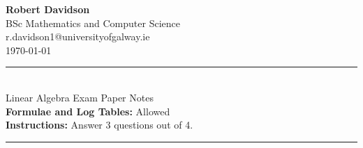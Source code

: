 \documentclass[a4paper, 10pt]{article}
\begin{document}
\begin{center}
    \large
    \textbf{Robert Davidson}\\[8pt]
    \normalsize
    BSc Mathematics and Computer Science \\
    r.davidson1@universityofgalway.ie\\[8pt]
    \today\\[12pt]
\end{center}
\begin{center}
    \vspace*{\fill}
    \rule{0.9\textwidth}{0.4pt}\\[1em]
    \Large
    Linear Algebra Exam Paper Notes\\[1em]
    \normalsize
    \textbf{Formulae and Log Tables:} Allowed \\
    \textbf{Instructions:} Answer 3 questions out of 4.
    \rule{0.9\textwidth}{0.4pt}\\[1em]
    \vspace*{\fill}
\end{center}

\pagebreak
\end{document}
